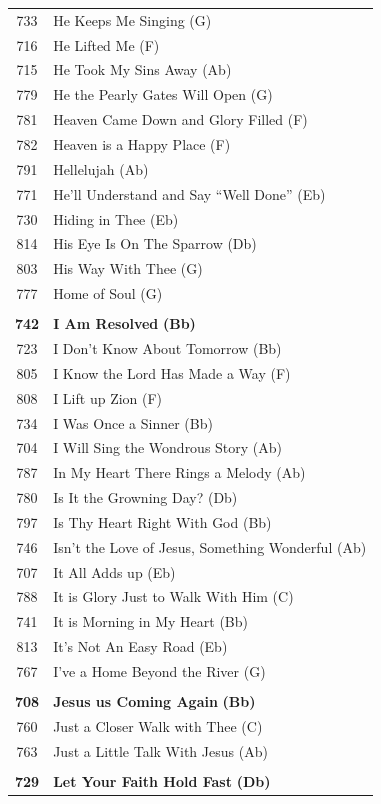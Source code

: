 \begin{small}
\begin{supertabular}{c l}
733 & He Keeps Me Singing (G) \\
716 & He Lifted Me (F) \\
715 & He Took My Sins Away (Ab) \\
779 & He the Pearly Gates Will Open (G) \\
781 & Heaven Came Down and Glory Filled (F) \\
782 & Heaven is a Happy Place (F) \\
791 & Hellelujah (Ab) \\
771 & He’ll Understand and Say “Well Done” (Eb) \\
730 & Hiding in Thee (Eb) \\
814 & His Eye Is On The Sparrow (Db) \\
803 & His Way With Thee (G) \\
777 & Home of Soul (G) \\
 & \\
\textbf{742} & \textbf{I Am Resolved} \textbf{(Bb)} \\
723 & I Don’t Know About Tomorrow (Bb) \\
805 & I Know the Lord Has Made a Way (F) \\
808 & I Lift up Zion (F) \\
734 & I Was Once a Sinner (Bb) \\
704 & I Will Sing the Wondrous Story (Ab) \\
787 & In My Heart There Rings a Melody (Ab) \\
780 & Is It the Growning Day? (Db) \\
797 & Is Thy Heart Right With God (Bb) \\
746 & Isn’t the Love of Jesus, Something Wonderful (Ab) \\
707 & It All Adds up (Eb) \\
788 & It is Glory Just to Walk With Him (C) \\
741 & It is Morning in My Heart (Bb) \\
813 & It’s Not An Easy Road (Eb) \\
767 & I’ve a Home Beyond the River (G) \\
 & \\
\textbf{708} & \textbf{Jesus us Coming Again} \textbf{(Bb)} \\
760 & Just a Closer Walk with Thee (C) \\
763 & Just a Little Talk With Jesus (Ab) \\
 & \\
\textbf{729} & \textbf{Let Your Faith Hold Fast} \textbf{(Db)} \\

\end{supertabular}
\end{small}
